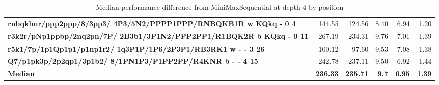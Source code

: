 \begin{table}[H]
{\begin{tabular}{|p{8cm}|*{5}{r|}}
\rowcolor[HTML]{FFFFFF}
\textbf{rnbqkbnr/ppp2ppp/8/3pp3/ 4P3/5N2/PPPP1PPP/RNBQKB1R w KQkq - 0 4}               & 144.55 & 124.56 & 8.40 & 6.94 & 1.20 \\

\rowcolor[HTML]{EFEFEF}
\textbf{r3k2r/pNp1ppbp/2nq2pn/7P/ 2B3b1/3P1N2/PPP2PP1/R1BQK2R b KQkq - 0 11}               & 267.19 & 234.31 & 9.76 & 7.01 & 1.39 \\

\rowcolor[HTML]{FFFFFF}
\textbf{r5k1/7p/1p1Qp1p1/p1np1r2/ 1q3P1P/1P6/2P3P1/RB3RK1 w - - 3 26}               & 100.12 & 97.60 & 9.53 & 7.08 & 1.38 \\

\rowcolor[HTML]{EFEFEF}
\textbf{Q7/p1pk3p/2p2qp1/3p1b2/ 8/1PN1P3/P1PP2PP/R4KNR b - - 4 15}               & 242.78 & 237.11 & 9.50 & 6.92 & 1.44 \\
\hline
\hline
\rowcolor[HTML]{FFFFFF}
\textbf{Median}               & \textbf{236.33} & \textbf{235.71} & \textbf{9.7} & \textbf{6.95} & \textbf{1.39} \\

            \hline
        \end{tabular}%
    }
    \caption{Median performance difference from MiniMaxSequential at depth 4 by position}
    \label{tab:median-performance-difference-from-minimaxsequential-at-depth-4-by-position}
\end{table}

